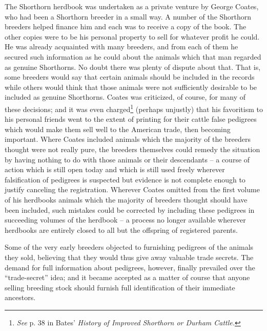 The Shorthorn herdbook was undertaken as a private venture by George Coates, who had been a Shorthorn breeder in a small 
way. A number of the Shorthorn breeders helped finance him and each was to receive a copy of the book. The other copies 
were to be his personal property to sell for whatever profit he could. He was already acquainted with many breeders, and 
from each of them he secured such information as he could about the animals which that man regarded as genuine Shorthorns. 
No doubt there was plenty of dispute about that. That is, some breeders would say that certain animals should be included 
in the records while others would think that those animals were not sufficiently desirable to be included as genuine 
Shorthorns. Coates was criticized, of course, for many of these decisions; and it was even charged\footnote{\textit{See} p. 
38 in Bates' \textit{History of Improved Shorthorn or Durham Cattle.}} (perhaps unjustly) that his favoritism to his 
personal friends went to the extent of printing for their cattle false pedigrees which would make them sell well to the 
American trade, then becoming important. Where Coates included animals which the majority of the breeders thought were not 
really pure, the breeders themselves could remedy the situation by having nothing to do with those animals or their 
descendants -- a course of action which is still open today and which is still used freely wherever falsification of 
pedigrees is suspected but evidence is not complete enough to justify canceling the registration. Wherever Coates omitted 
from the first volume of his herdbooks animals which the majority of breeders thought should have been included, such 
mistakes could be corrected by including these pedigrees in succeeding volumes of the herdbook -- a process no longer 
available wherever herdbooks are entirely closed to all but the offspring of registered parents.

Some of the very early breeders objected to furnishing pedigrees of the animals they sold, believing that they would thus 
give away valuable trade secrets. The demand for full information about pedigrees, however, finally prevailed over the
``trade-secret'' idea; and it became accepted as a matter of course that anyone selling breeding stock should furnish full 
identification of their immediate ancestors.

